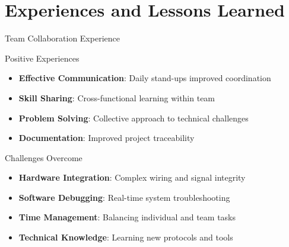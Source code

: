 \documentclass[aspectratio=169]{beamer}
\begin{document}
\section{Experiences and Lessons Learned}

\begin{frame}{Team Collaboration Experience}
\begin{block}{Positive Experiences}
\begin{itemize}
    \item \textbf{Effective Communication}: Daily stand-ups improved coordination
    \item \textbf{Skill Sharing}: Cross-functional learning within team
    \item \textbf{Problem Solving}: Collective approach to technical challenges
    \item \textbf{Documentation}: Improved project traceability
\end{itemize}
\end{block}

\begin{block}{Challenges Overcome}
\begin{itemize}
    \item \textbf{Hardware Integration}: Complex wiring and signal integrity
    \item \textbf{Software Debugging}: Real-time system troubleshooting
    \item \textbf{Time Management}: Balancing individual and team tasks
    \item \textbf{Technical Knowledge}: Learning new protocols and tools
\end{itemize}
\end{block}
\end{frame}
\end{document}
